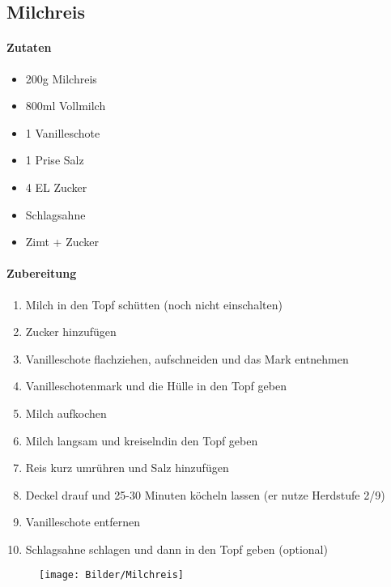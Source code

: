 \newpage
\subsection{Milchreis}
\paragraph{Zutaten}
\begin{itemize}[noitemsep]
	\item 200g Milchreis
	\item 800ml Vollmilch
	\item 1 Vanilleschote
	\item 1 Prise Salz
	\item 4 EL Zucker 
	\item Schlagsahne
	\item Zimt + Zucker
\end{itemize}
\paragraph{Zubereitung}
\begin{enumerate}[noitemsep]
	\item Milch in den Topf schütten (noch nicht einschalten) 
	\item Zucker hinzufügen
	\item Vanilleschote flachziehen, aufschneiden und das Mark entnehmen
	\item Vanilleschotenmark und die Hülle in den Topf geben 
	\item Milch aufkochen 
	\item Milch langsam und \glqq kreiselnd\grqq in den Topf geben
	\item Reis kurz umrühren und Salz hinzufügen
	\item Deckel drauf und 25-30 Minuten köcheln lassen (er nutze Herdstufe 2/9)
	\item Vanilleschote entfernen
	\item Schlagsahne schlagen und dann in den Topf geben (optional)
\end{enumerate}
\vspace{1cm}
\begin{figure}[h]
\centering
\texttt{[image: Bilder/Milchreis]}
\end{figure}